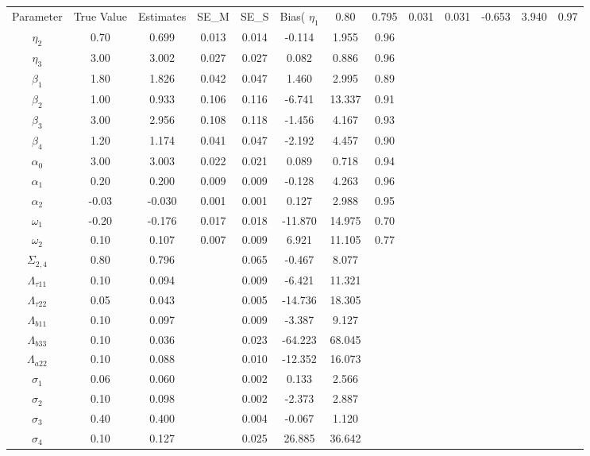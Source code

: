\begin{table}[ht]
\centering
\begin{tabular}{cccccccc}
  \hline
Parameter & True Value & Estimates & SE_M & SE_S & Bias(%
  \hline
$\eta_1$ & 0.80 & 0.795 & 0.031 & 0.031 & -0.653 & 3.940 & 0.97 \\ 
  $\eta_2$ & 0.70 & 0.699 & 0.013 & 0.014 & -0.114 & 1.955 & 0.96 \\ 
  $\eta_3$ & 3.00 & 3.002 & 0.027 & 0.027 & 0.082 & 0.886 & 0.96 \\ 
  $\beta_1$ & 1.80 & 1.826 & 0.042 & 0.047 & 1.460 & 2.995 & 0.89 \\ 
  $\beta_2$ & 1.00 & 0.933 & 0.106 & 0.116 & -6.741 & 13.337 & 0.91 \\ 
  $\beta_3$ & 3.00 & 2.956 & 0.108 & 0.118 & -1.456 & 4.167 & 0.93 \\ 
  $\beta_4$ & 1.20 & 1.174 & 0.041 & 0.047 & -2.192 & 4.457 & 0.90 \\ 
  $\alpha_0$ & 3.00 & 3.003 & 0.022 & 0.021 & 0.089 & 0.718 & 0.94 \\ 
  $\alpha_1$ & 0.20 & 0.200 & 0.009 & 0.009 & -0.128 & 4.263 & 0.96 \\ 
  $\alpha_2$ & -0.03 & -0.030 & 0.001 & 0.001 & 0.127 & 2.988 & 0.95 \\ 
  $\omega_1$ & -0.20 & -0.176 & 0.017 & 0.018 & -11.870 & 14.975 & 0.70 \\ 
  $\omega_2$ & 0.10 & 0.107 & 0.007 & 0.009 & 6.921 & 11.105 & 0.77 \\ 
   \hline
$\Sigma_{2,4}$ & 0.80 & 0.796 &  & 0.065 & -0.467 & 8.077 &  \\ 
  $\Lambda_{\tau11}$ & 0.10 & 0.094 &  & 0.009 & -6.421 & 11.321 &  \\ 
  $\Lambda_{\tau22}$ & 0.05 & 0.043 &  & 0.005 & -14.736 & 18.305 &  \\ 
  $\Lambda_{b11}$ & 0.10 & 0.097 &  & 0.009 & -3.387 & 9.127 &  \\ 
  $\Lambda_{b33}$ & 0.10 & 0.036 &  & 0.023 & -64.223 & 68.045 &  \\ 
  $\Lambda_{a22}$ & 0.10 & 0.088 &  & 0.010 & -12.352 & 16.073 &  \\ 
  $\sigma_1$ & 0.06 & 0.060 &  & 0.002 & 0.133 & 2.566 &  \\ 
  $\sigma_2$ & 0.10 & 0.098 &  & 0.002 & -2.373 & 2.887 &  \\ 
  $\sigma_3$ & 0.40 & 0.400 &  & 0.004 & -0.067 & 1.120 &  \\ 
  $\sigma_4$ & 0.10 & 0.127 &  & 0.025 & 26.885 & 36.642 &  \\ 
   \hline
\end{tabular}
\end{table}
